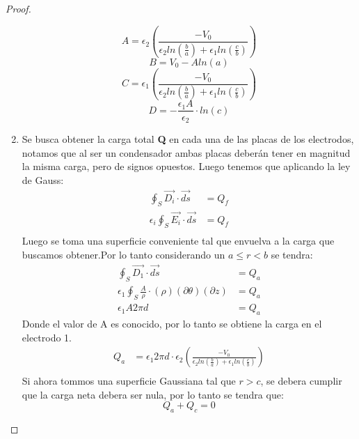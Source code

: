 \begin{proof}
\begin{enumerate}
        \begin{equation}
        A= \epsilon_{2}\left(\frac{-V_{0} }{\epsilon_{2}ln(\frac{b}{a}) + \epsilon_{1}ln(\frac{c}{b})}\right)
        \end{equation}
        \begin{equation}
        B = V_{0} - Aln(a)
        \end{equation}
        \begin{equation}
        C = \epsilon_{1}\left(\frac{-V_{0}}{\epsilon_{2}ln(\frac{b}{a}) + \epsilon_{1}ln(\frac{c}{b})}\right)
        \end{equation}
        \begin{equation}
        D=-\frac{\epsilon_{1}A}{\epsilon_{2}}\cdot ln(c)
        \end{equation}
    \item Se busca obtener la carga total \textbf{Q} en cada una de las placas de los electrodos, notamos que al ser un condensador ambas placas deberán tener en magnitud la misma carga, pero de signos opuestos. Luego tenemos que aplicando la ley de Gauss:
    \begin{align}
        \oint_{S} \vec{D_{i}} \cdot \vec{ds} &= Q_f\\
    \epsilon_{i} \oint_{S} \vec{E_{i}} \cdot \vec{ds} &= Q_f\\
    \end{align}
    Luego se toma una superficie conveniente tal que envuelva a la carga que buscamos obtener.Por lo tanto considerando un $a \leq r <b$ se tendra:
    \begin{align}
        \oint_{S} \vec{D_{1}} \cdot \vec{ds} &= Q_{a}\\  
        \epsilon_{1} \oint_{S} \frac{A}{\rho} \cdot (\rho) (\partial \theta) (\partial z) &= Q_{a}\\
        \epsilon_{1} A 2 \pi d &= Q_{a}
    \end{align}
    Donde el valor de A es conocido, por lo tanto se obtiene la carga en el electrodo 1.
    \begin{align}
        Q_{a} &= \epsilon_{1}  2 \pi d \cdot \epsilon_{2}\left(\frac{-V_{0} }{\epsilon_{2}ln(\frac{b}{a}) + \epsilon_{1}ln(\frac{c}{b})}\right)\\
    \end{align}
    Si ahora tommos una superficie Gaussiana tal que $ r > c$, se debera cumplir que la carga neta debera ser nula, por lo tanto se tendra que:
    \begin{equation}
        Q_{a} + Q_{c} = 0
    \end{equation}

\end{enumerate}
\end{proof}
